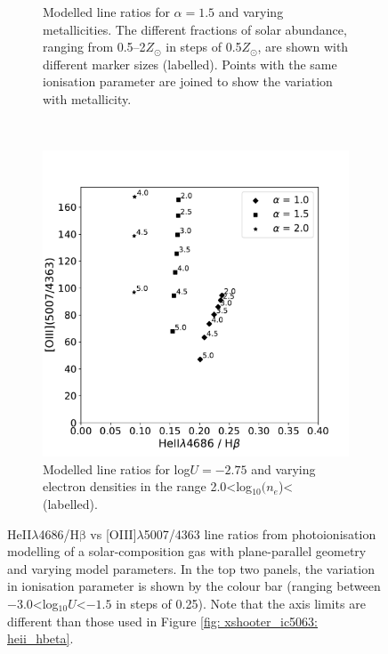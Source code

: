 \begin{figure}
\begin{subfigure}[t]{0.49\textwidth}
        \captionsetup{width=.9\linewidth}
        \caption{Modelled line ratios for $\alpha=1.5$ and varying metallicities. The different fractions of solar abundance, ranging from 0.5--2\;$Z_\odot$ in steps of 0.5\;$Z_\odot$, are shown with different marker sizes (labelled). Points with the same ionisation parameter are joined to show the variation with metallicity.}
        \label{fig: heii_hb_oiii_photoionisation_modelling: heii_hbeta_z}
    \end{subfigure} \\
    \vfill
    \centering
    \begin{subfigure}[t]{0.49\textwidth}
        \includegraphics[width = \linewidth]{figures/heii_hb_oiii_photoionisation_modelling/ne_vary.pdf}
        \caption{Modelled line ratios for log$U=-2.75$ and varying electron densities in the range \mbox{2.0\;\textless\;log$_\mathrm{10}(n_e$\;[cm$^{-3}$])\;\textless{}} (labelled).}
        \label{fig: heii_hb_oiii_photoionisation_modelling: heii_hbeta_ne}
    \end{subfigure}
    \vspace{0.2cm}
    \caption[The HeII$\lambda$4686/H$\mathrm{\beta}$ vs {[}OIII{]}$\lambda$5007/4363 diagnostic diagram with varying model parameters.]{HeII$\lambda$4686/H$\mathrm{\beta}$ vs [OIII]$\lambda$5007/4363 line ratios from photoionisation modelling of a solar-composition gas with plane-parallel geometry and varying model parameters. In the top two panels, the variation in ionisation parameter is shown by the colour bar (ranging between \mbox{$-3.0$\;\textless\;log$_{10}U$\;\textless\;$-1.5$} in steps of 0.25). Note that the axis limits are different than those used in Figure \ref{fig: xshooter_ic5063: heii_hbeta}.}
\end{figure}